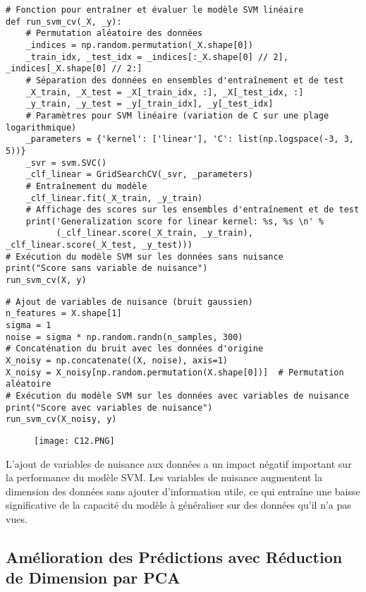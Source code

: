 \documentclass[12pt,a4paper]{report}
\begin{document}
\begin{lstlisting}
# Fonction pour entraîner et évaluer le modèle SVM linéaire
def run_svm_cv(_X, _y):
    # Permutation aléatoire des données
    _indices = np.random.permutation(_X.shape[0])
    _train_idx, _test_idx = _indices[:_X.shape[0] // 2], _indices[_X.shape[0] // 2:]
    # Séparation des données en ensembles d'entraînement et de test
    _X_train, _X_test = _X[_train_idx, :], _X[_test_idx, :]
    _y_train, _y_test = _y[_train_idx], _y[_test_idx]
    # Paramètres pour SVM linéaire (variation de C sur une plage logarithmique)
    _parameters = {'kernel': ['linear'], 'C': list(np.logspace(-3, 3, 5))}
    _svr = svm.SVC()
    _clf_linear = GridSearchCV(_svr, _parameters)   
    # Entraînement du modèle
    _clf_linear.fit(_X_train, _y_train)
    # Affichage des scores sur les ensembles d'entraînement et de test
    print('Generalization score for linear kernel: %s, %s \n' %
          (_clf_linear.score(_X_train, _y_train), _clf_linear.score(_X_test, _y_test)))
# Exécution du modèle SVM sur les données sans nuisance
print("Score sans variable de nuisance")
run_svm_cv(X, y)
\end{lstlisting}
\begin{lstlisting}
# Ajout de variables de nuisance (bruit gaussien)
n_features = X.shape[1]
sigma = 1
noise = sigma * np.random.randn(n_samples, 300)
# Concaténation du bruit avec les données d'origine
X_noisy = np.concatenate((X, noise), axis=1)
X_noisy = X_noisy[np.random.permutation(X.shape[0])]  # Permutation aléatoire
# Exécution du modèle SVM sur les données avec variables de nuisance
print("Score avec variables de nuisance")
run_svm_cv(X_noisy, y)
\end{lstlisting}
\begin{figure}[H]
    \centering
    \begin{minipage}{0.9\textwidth}
        \centering
        \texttt{[image: C12.PNG]}
       
    \end{minipage}
    \end{figure}
L'ajout de variables de nuisance aux données a un impact négatif important sur la performance du modèle SVM. Les variables de nuisance augmentent la dimension des données sans ajouter d'information utile, ce qui entraîne une baisse significative de la capacité du modèle à généraliser sur des données qu'il n'a pas vues.
\subsection{Amélioration des Prédictions avec Réduction de Dimension par PCA}
\end{document}
